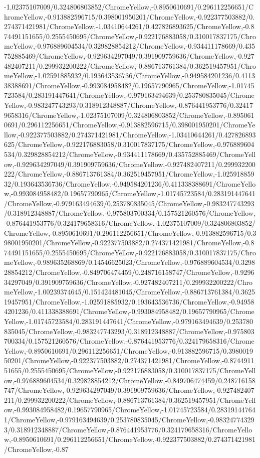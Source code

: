 {\begin{tikzternal}
{-1.02375107009/0.324806803852/ChromeYellow,-0.8950610691/0.296112256651/ChromeYellow,-0.913882596715/0.398001950201/ChromeYellow,-0.922377503882/0.274371421981/ChromeYellow,-1.03410644261/0.427826893625/ChromeYellow,-0.874491151655/0.2555450695/ChromeYellow,-0.922176883058/0.310017837175/ChromeYellow,-0.976889604534/0.329828854212/ChromeYellow,-0.934411178669/0.435752885469/ChromeYellow,-0.929634297049/0.391909759636/ChromeYellow,-0.927482407211/0.299932200222/ChromeYellow,-0.886713761384/0.362519457951/ChromeYellow,-1.02591885932/0.193643536736/ChromeYellow,-0.949584201236/0.411338388691/ChromeYellow,-0.993084958482/0.19657790965/ChromeYellow,-1.01745723584/0.283191447641/ChromeYellow,-0.979163494639/0.253780835045/ChromeYellow,-0.983247743293/0.318912348887/ChromeYellow,-0.876441953776/0.324179658316/ChromeYellow,-1.02375107009/0.324806803852/ChromeYellow,-0.8950610691/0.296112256651/ChromeYellow,-0.913882596715/0.398001950201/ChromeYellow,-0.922377503882/0.274371421981/ChromeYellow,-1.03410644261/0.427826893625/ChromeYellow,-0.922176883058/0.310017837175/ChromeYellow,-0.976889604534/0.329828854212/ChromeYellow,-0.934411178669/0.435752885469/ChromeYellow,-0.929634297049/0.391909759636/ChromeYellow,-0.927482407211/0.299932200222/ChromeYellow,-0.886713761384/0.362519457951/ChromeYellow,-1.02591885932/0.193643536736/ChromeYellow,-0.949584201236/0.411338388691/ChromeYellow,-0.993084958482/0.19657790965/ChromeYellow,-1.01745723584/0.283191447641/ChromeYellow,-0.979163494639/0.253780835045/ChromeYellow,-0.983247743293/0.318912348887/ChromeYellow,-0.975803700334/0.157521260576/ChromeYellow,-0.876441953776/0.324179658316/ChromeYellow,-1.02375107009/0.324806803852/ChromeYellow,-0.8950610691/0.296112256651/ChromeYellow,-0.913882596715/0.398001950201/ChromeYellow,-0.922377503882/0.274371421981/ChromeYellow,-0.874491151655/0.2555450695/ChromeYellow,-0.922176883058/0.310017837175/ChromeYellow,-0.989635268869/0.14546625023/ChromeYellow,-0.976889604534/0.329828854212/ChromeYellow,-0.849706474459/0.248716158747/ChromeYellow,-0.929634297049/0.391909759636/ChromeYellow,-0.927482407211/0.299932200222/ChromeYellow,-1.00239374645/0.151424481045/ChromeYellow,-0.886713761384/0.362519457951/ChromeYellow,-1.02591885932/0.193643536736/ChromeYellow,-0.949584201236/0.411338388691/ChromeYellow,-0.993084958482/0.19657790965/ChromeYellow,-1.01745723584/0.283191447641/ChromeYellow,-0.979163494639/0.253780835045/ChromeYellow,-0.983247743293/0.318912348887/ChromeYellow,-0.975803700334/0.157521260576/ChromeYellow,-0.876441953776/0.324179658316/ChromeYellow,-0.8950610691/0.296112256651/ChromeYellow,-0.913882596715/0.398001950201/ChromeYellow,-0.922377503882/0.274371421981/ChromeYellow,-0.874491151655/0.2555450695/ChromeYellow,-0.922176883058/0.310017837175/ChromeYellow,-0.976889604534/0.329828854212/ChromeYellow,-0.849706474459/0.248716158747/ChromeYellow,-0.929634297049/0.391909759636/ChromeYellow,-0.927482407211/0.299932200222/ChromeYellow,-0.886713761384/0.362519457951/ChromeYellow,-0.993084958482/0.19657790965/ChromeYellow,-1.01745723584/0.283191447641/ChromeYellow,-0.979163494639/0.253780835045/ChromeYellow,-0.983247743293/0.318912348887/ChromeYellow,-0.876441953776/0.324179658316/ChromeYellow,-0.8950610691/0.296112256651/ChromeYellow,-0.922377503882/0.274371421981/ChromeYellow,-0.87}
\end{tikzternal}}
